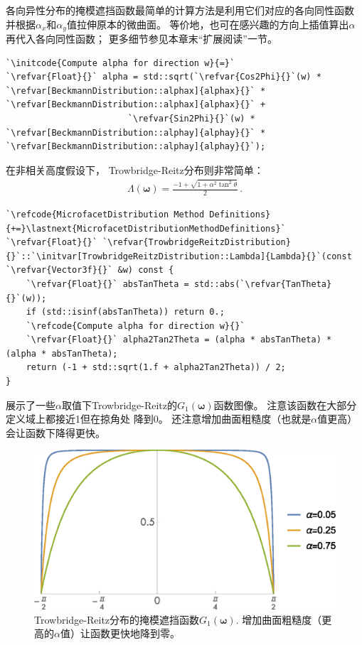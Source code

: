 各向异性分布的掩模遮挡函数最简单的计算方法是利用它们对应的各向同性函数
并根据$\alpha_x$和$\alpha_y$值拉伸原本的微曲面。
等价地，也可在感兴趣的方向上插值算出$\alpha$再代入各向同性函数；
更多细节参见本章末“扩展阅读”一节。
\begin{lstlisting}
`\initcode{Compute alpha for direction w}{=}`
`\refvar{Float}{}` alpha = std::sqrt(`\refvar{Cos2Phi}{}`(w) * `\refvar[BeckmannDistribution::alphax]{alphax}{}` * `\refvar[BeckmannDistribution::alphax]{alphax}{}` +
                        `\refvar{Sin2Phi}{}`(w) * `\refvar[BeckmannDistribution::alphay]{alphay}{}` * `\refvar[BeckmannDistribution::alphay]{alphay}{}`);
\end{lstlisting}

在非相关高度假设下，
Trowbridge-Reitz分布则非常简单：
\begin{align*}
    \Lambda({\bm\omega})=\frac{-1+\sqrt{1+\alpha^2\tan^2\theta}}{2}\, .
\end{align*}
\begin{lstlisting}
`\refcode{MicrofacetDistribution Method Definitions}{+=}\lastnext{MicrofacetDistributionMethodDefinitions}`
`\refvar{Float}{}` `\refvar{TrowbridgeReitzDistribution}{}`::`\initvar[TrowbridgeReitzDistribution::Lambda]{Lambda}{}`(const `\refvar{Vector3f}{}` &w) const {
    `\refvar{Float}{}` absTanTheta = std::abs(`\refvar{TanTheta}{}`(w));
    if (std::isinf(absTanTheta)) return 0.;
    `\refcode{Compute alpha for direction w}{}`
    `\refvar{Float}{}` alpha2Tan2Theta = (alpha * absTanTheta) * (alpha * absTanTheta);
    return (-1 + std::sqrt(1.f + alpha2Tan2Theta)) / 2;
}
\end{lstlisting}

展示了一些$\alpha$取值下Trowbridge-Reitz的$G_1({\bm\omega})$函数图像。
注意该函数在大部分定义域上都接近1但在掠角处
降到0。
还注意增加曲面粗糙度（也就是$\alpha$值更高）会让函数下降得更快。
\begin{figure}[htbp]
    \centering
    \includegraphics[width=0.75\linewidth]{Pictures/chap08/tr-g1-vs-alpha.eps}
    \caption{Trowbridge-Reitz分布的掩模遮挡函数$G_1({\bm\omega})$.
    增加曲面粗糙度（更高的$\alpha$值）让函数更快地降到零。}
    \label{fig:8.18}
\end{figure}

